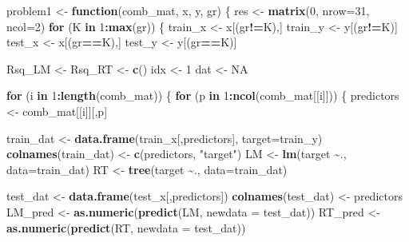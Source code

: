 \documentclass[
]{article}
\newenvironment{Shaded}{\begin{snugshade}}{\end{snugshade}}
\newcommand{\AttributeTok}[1]{\textcolor[rgb]{0.13,0.29,0.53}{#1}}
\newcommand{\ConstantTok}[1]{\textcolor[rgb]{0.56,0.35,0.01}{#1}}
\newcommand{\ControlFlowTok}[1]{\textcolor[rgb]{0.13,0.29,0.53}{\textbf{#1}}}
\newcommand{\DecValTok}[1]{\textcolor[rgb]{0.00,0.00,0.81}{#1}}
\newcommand{\FunctionTok}[1]{\textcolor[rgb]{0.13,0.29,0.53}{\textbf{#1}}}
\newcommand{\NormalTok}[1]{#1}
\newcommand{\OtherTok}[1]{\textcolor[rgb]{0.56,0.35,0.01}{#1}}
\newcommand{\SpecialCharTok}[1]{\textcolor[rgb]{0.81,0.36,0.00}{\textbf{#1}}}
\newcommand{\StringTok}[1]{\textcolor[rgb]{0.31,0.60,0.02}{#1}}
\begin{document}
\begin{Shaded}
\begin{Highlighting}[]
\NormalTok{problem1 }\OtherTok{\textless{}{-}} \ControlFlowTok{function}\NormalTok{(comb\_mat, x, y, gr) \{}
\NormalTok{  res }\OtherTok{\textless{}{-}} \FunctionTok{matrix}\NormalTok{(}\DecValTok{0}\NormalTok{, }\AttributeTok{nrow=}\DecValTok{31}\NormalTok{, }\AttributeTok{ncol=}\DecValTok{2}\NormalTok{)}
  \ControlFlowTok{for}\NormalTok{ (K }\ControlFlowTok{in} \DecValTok{1}\SpecialCharTok{:}\FunctionTok{max}\NormalTok{(gr)) \{}
\NormalTok{    train\_x }\OtherTok{\textless{}{-}}\NormalTok{ x[(gr}\SpecialCharTok{!=}\NormalTok{K),]}
\NormalTok{    train\_y }\OtherTok{\textless{}{-}}\NormalTok{ y[(gr}\SpecialCharTok{!=}\NormalTok{K)]}
\NormalTok{    test\_x }\OtherTok{\textless{}{-}}\NormalTok{ x[(gr}\SpecialCharTok{==}\NormalTok{K),]}
\NormalTok{    test\_y }\OtherTok{\textless{}{-}}\NormalTok{ y[(gr}\SpecialCharTok{==}\NormalTok{K)]}
    
\NormalTok{    Rsq\_LM }\OtherTok{\textless{}{-}}\NormalTok{ Rsq\_RT }\OtherTok{\textless{}{-}} \FunctionTok{c}\NormalTok{()}
\NormalTok{    idx }\OtherTok{\textless{}{-}} \DecValTok{1}
\NormalTok{    dat }\OtherTok{\textless{}{-}} \ConstantTok{NA}
    
    \ControlFlowTok{for}\NormalTok{ (i }\ControlFlowTok{in} \DecValTok{1}\SpecialCharTok{:}\FunctionTok{length}\NormalTok{(comb\_mat)) \{}
      \ControlFlowTok{for}\NormalTok{ (p }\ControlFlowTok{in} \DecValTok{1}\SpecialCharTok{:}\FunctionTok{ncol}\NormalTok{(comb\_mat[[i]])) \{}
\NormalTok{        predictors }\OtherTok{\textless{}{-}}\NormalTok{ comb\_mat[[i]][,p]}
        
\NormalTok{        train\_dat }\OtherTok{\textless{}{-}} \FunctionTok{data.frame}\NormalTok{(train\_x[,predictors], }\AttributeTok{target=}\NormalTok{train\_y)}
        \FunctionTok{colnames}\NormalTok{(train\_dat) }\OtherTok{\textless{}{-}} \FunctionTok{c}\NormalTok{(predictors, }\StringTok{"target"}\NormalTok{)}
\NormalTok{        LM }\OtherTok{\textless{}{-}} \FunctionTok{lm}\NormalTok{(target }\SpecialCharTok{\textasciitilde{}}\NormalTok{., }\AttributeTok{data=}\NormalTok{train\_dat)}
\NormalTok{        RT }\OtherTok{\textless{}{-}} \FunctionTok{tree}\NormalTok{(target }\SpecialCharTok{\textasciitilde{}}\NormalTok{., }\AttributeTok{data=}\NormalTok{train\_dat)}
        
\NormalTok{        test\_dat }\OtherTok{\textless{}{-}} \FunctionTok{data.frame}\NormalTok{(test\_x[,predictors])}
        \FunctionTok{colnames}\NormalTok{(test\_dat) }\OtherTok{\textless{}{-}}\NormalTok{ predictors}
\NormalTok{        LM\_pred }\OtherTok{\textless{}{-}} \FunctionTok{as.numeric}\NormalTok{(}\FunctionTok{predict}\NormalTok{(LM, }\AttributeTok{newdata =}\NormalTok{ test\_dat))}
\NormalTok{        RT\_pred }\OtherTok{\textless{}{-}} \FunctionTok{as.numeric}\NormalTok{(}\FunctionTok{predict}\NormalTok{(RT, }\AttributeTok{newdata =}\NormalTok{ test\_dat))}
        

\end{Highlighting}
\end{Shaded}
\end{document}
